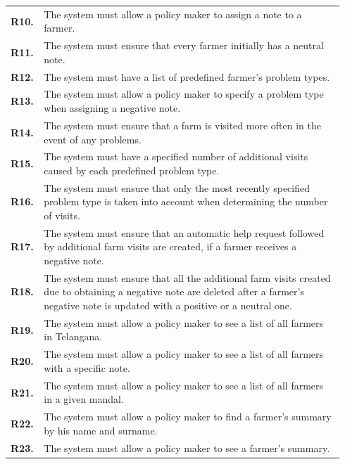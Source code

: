 \begin{longtable}{@{}p{0.06\linewidth} p{0.88\linewidth}}
	\textbf{R10.} & The system must allow a policy maker to assign a note to a farmer.\\
	\textbf{R11.} & The system must ensure that every farmer initially has a neutral note.\\
	\textbf{R12.} & The system must have a list of predefined farmer's problem types.\\
    \textbf{R13.} & The system must allow a policy maker to specify a problem type when assigning a negative note.\\
    \textbf{R14.} & The system must ensure that a farm is visited more often in the event of any problems.\\
    \textbf{R15.} & The system must have a specified number of additional visits caused by each predefined problem type.\\
    \textbf{R16.} & The system must ensure that only the most recently specified problem type is taken into account when determining the number of visits.\\
	\textbf{R17.} & The system must ensure that an automatic help request followed by additional farm visits are created, if a farmer receives a negative note.\\
	\textbf{R18.} & The system must ensure that all the additional farm visits created due to obtaining a negative note are deleted after a farmer's negative note is updated with a positive or a neutral one.\\
	\textbf{R19.} & The system must allow a policy maker to see a list of all farmers in Telangana.\\
	\textbf{R20.} & The system must allow a policy maker to see a list of all farmers with a specific note.\\
	\textbf{R21.} & The system must allow a policy maker to see a list of all farmers in a given mandal.\\
	\textbf{R22.} & The system must allow a policy maker to find a farmer's summary by his name and surname.\\
	\textbf{R23.} & The system must allow a policy maker to see a farmer's summary.\\
	

\end{longtable}
